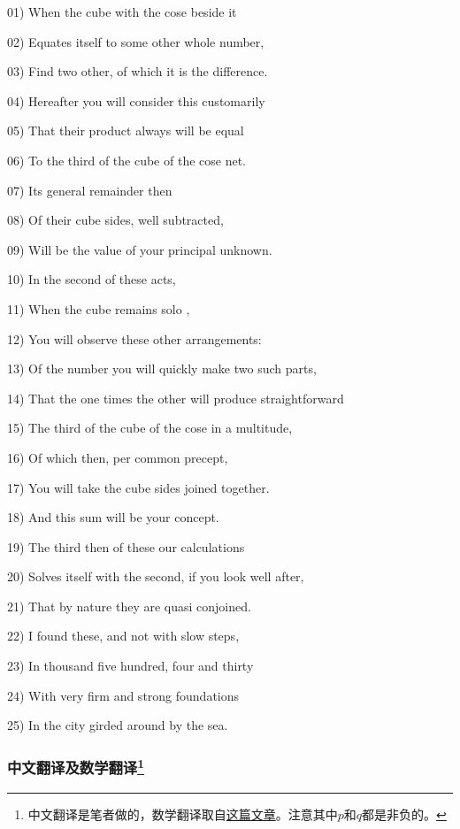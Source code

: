 01) When the cube with the cose beside it 

02) Equates itself to some other whole number,

03) Find two other, of which it is the difference. 

04) Hereafter you will consider this customarily

05) That their product always will be equal 

06) To the third of the cube of the cose net. 

07) Its general remainder then

08) Of their cube sides, well subtracted, 

09) Will be the value of your principal unknown.

10) In the second of these acts,

11) When the cube remains solo , 

12) You will observe these other arrangements:

13) Of the number you will quickly make two such parts,

14) That the one times the other will produce straightforward 

15) The third of the cube of the cose in a multitude, 

16) Of which then, per common precept,

17) You will take the cube sides joined together. 

18) And this sum will be your concept. 

19) The third then of these our calculations 

20) Solves itself with the second, if you look well after,

21) That by nature they are quasi conjoined.

22) I found these, and not with slow steps,

23) In thousand five hundred, four and thirty

24) With very firm and strong foundations

25) In the city girded around by the sea.


\subsubsection{中文翻译及数学翻译\footnote{中文翻译是笔者做的，数学翻译取自\href{https://www.maa.org/press/periodicals/convergence/how-tartaglia-solved-the-cubic-equation-tartaglias-poem}{这篇文章}。注意其中$p$和$q$都是非负的。}}

